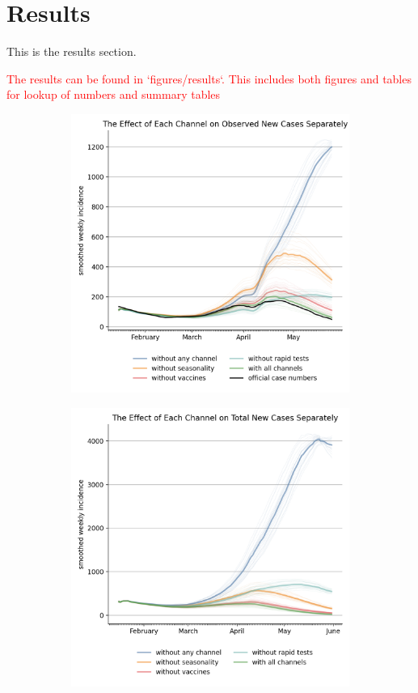 \section{Results}
\label{sec:results}

This is the results section.

\textcolor{red}{The results can be found in `figures/results`. This includes both figures
and tables for lookup of numbers and summary tables}



\begin{figure}[ht]
\centering
\caption{The Effect of Different School Scenarios on Observed New Cases}
\label{fig:school_scenarios}
\begin{subfigure}{.6\textwidth}
  \includegraphics[width=0.9 \textwidth]{../figures/results/figures/comparisons/one_off_and_combined/full_new_known_case}
\end{subfigure}%
\begin{subfigure}{.6\textwidth}
  \includegraphics[width=0.9 \textwidth]{../figures/results/figures/comparisons/one_off_and_combined/full_newly_infected}

\end{subfigure}
\end{figure}
